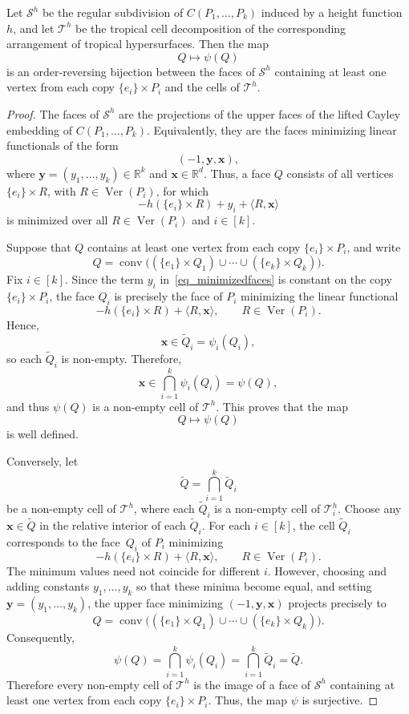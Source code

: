 \documentclass[10pt,a4paper]{amsart}
\begin{document}
\begin{theorem}\label{thm_Cayley_tropicalArrangement}
Let $\mathcal{S}^h$ be the regular subdivision of $C(P_1,\ldots,P_k)$ induced by a height function $h$, and let $\mathscr{T}^h$ be the tropical cell decomposition of the corresponding arrangement of tropical hypersurfaces. Then the map
\[
Q\longmapsto\psi(Q)
\]
is an order-reversing bijection between the faces of $\mathcal{S}^h$ containing at least one vertex from each copy $\{e_i\}\times P_i$ and the cells of $\mathscr{T}^h$.
\end{theorem}

\begin{proof}
The faces of $\mathcal{S}^h$ are the projections of the upper faces of the lifted Cayley embedding of $C(P_1,\dots,P_k)$. Equivalently, they are the faces minimizing linear functionals of the form
\[
(-1,\mathbf{y},\mathbf{x}),
\]
where $\mathbf{y}=(y_1,\dots,y_k)\in\mathbb{R}^k$ and $\mathbf{x}\in\mathbb{R}^d$. Thus, a face $Q$ consists of all vertices $\{e_i\}\times R$, with $R\in\operatorname{Ver}(P_i)$, for which
\begin{equation}\label{eq_minimizedfaces}
-h(\{e_i\}\times R)+y_i+\langle R,\mathbf{x}\rangle
\end{equation}
is minimized over all $R\in\operatorname{Ver}(P_i)$ and $i\in[k]$.

Suppose that $Q$ contains at least one vertex from each copy $\{e_i\}\times P_i$, and write
\[
Q=
\operatorname{conv}\bigl((\{e_1\}\times Q_1)\cup\cdots\cup(\{e_k\}\times Q_k)\bigr).
\]
Fix $i\in[k]$. Since the term $y_i$ in~\eqref{eq_minimizedfaces} is constant on the copy $\{e_i\}\times P_i$, the face $Q_i$ is precisely the face of $P_i$ minimizing the linear functional
\[
-h(\{e_i\}\times R)+\langle R,\mathbf{x}\rangle,
\qquad
R\in\operatorname{Ver}(P_i).
\]
Hence,
\[
\mathbf{x}\in\tilde Q_i=\psi_i(Q_i),
\]
so each $\tilde Q_i$ is non-empty. Therefore,
\[
\mathbf{x}\in\bigcap_{i=1}^k\psi_i(Q_i)
=\psi(Q),
\]
and thus $\psi(Q)$ is a non-empty cell of $\mathscr{T}^h$. This proves that the map
\[
Q\longmapsto\psi(Q)
\]
is well defined.

Conversely, let
\[
\tilde Q=\bigcap_{i=1}^k\tilde Q_i
\]
be a non-empty cell of $\mathscr{T}^h$, where each $\tilde Q_i$ is a non-empty cell of $\mathcal{T}_i^h$. Choose any $\mathbf{x}\in\tilde Q$ in the relative interior of each $\tilde Q_i$. For each $i\in[k]$, the cell $\tilde Q_i$ corresponds to the face~$Q_i$ of $P_i$ minimizing
\[
-h(\{e_i\}\times R)+\langle R,\mathbf{x}\rangle,
\qquad
R\in\operatorname{Ver}(P_i).
\]
The minimum values need not coincide for different $i$. However, choosing and adding constants $y_1,\dots,y_k$ so that these minima become equal, and setting $\mathbf{y}=(y_1,\dots,y_k)$, the upper face minimizing $(-1,\mathbf{y},\mathbf{x})$ projects precisely to
\[
Q=
\operatorname{conv}\bigl((\{e_1\}\times Q_1)\cup\cdots\cup(\{e_k\}\times Q_k)\bigr).
\]
Consequently,
\[
\psi(Q)
=\bigcap_{i=1}^k\psi_i(Q_i)
=\bigcap_{i=1}^k\tilde Q_i
=\tilde Q.
\]
Therefore every non-empty cell of $\mathscr{T}^h$ is the image of a face of $\mathcal{S}^h$ containing at least one vertex from each copy $\{e_i\}\times P_i$. Thus, the map $\psi$ is surjective.


\end{proof}
\end{document}
